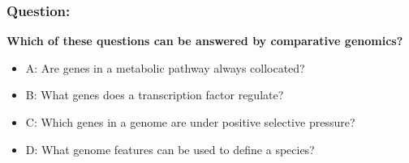 
%
\begin{frame}
  \frametitle{Question:}
  \textbf{Which of these questions can be answered by comparative genomics?}
  \begin{itemize}
    \item A: Are genes in a metabolic pathway always collocated?
    \item B: What genes does a transcription factor regulate?
    \item C: Which genes in a genome are under positive selective pressure?
    \item D: What genome features can be used to define a species?
  \end{itemize}
\end{frame}